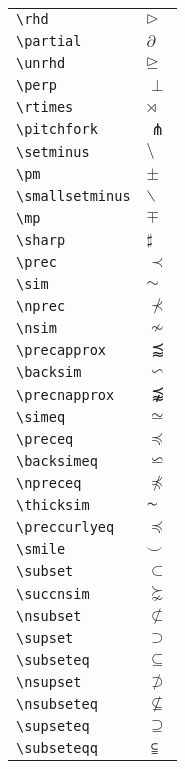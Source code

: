\documentclass[text,xhtml,itex]{internet}
\begin{document}
\begin{tabular}{ll}
\verb+\rhd+ & \(\rhd\) \\
\verb+\partial+ & \(\partial\) \\
\verb+\unrhd+ & \(\unrhd\) \\
\verb+\perp+ & \(\perp\)             \\
\verb+\rtimes+ & \(\rtimes\) \\
\verb+\pitchfork+ & \(\pitchfork\) \\
\verb+\setminus+ & \(\setminus\) \\
\verb+\pm+ & \(\pm\)               \\
\verb+\smallsetminus+ & \(\smallsetminus\) \\
\verb+\mp+                & \(\mp\) \\
\verb+\sharp+ & \(\sharp\) \\
\verb+\prec+ & \(\prec\) \\
\verb+\sim+               & \(\sim\) \\
\verb+\nprec+ & \(\nprec\)            \\
\verb+\nsim+ & \(\nsim\) \\
\verb+\precapprox+ & \(\precapprox\) \\
\verb+\backsim+ & \(\backsim\) \\
\verb+\precnapprox+ & \(\precnapprox\)      \\
\verb+\simeq+ & \(\simeq\) \\
\verb+\preceq+ & \(\preceq\) \\
\verb+\backsimeq+ & \(\backsimeq\) \\
\verb+\npreceq+ & \(\npreceq\)          \\
\verb+\thicksim+ & \(\thicksim\) \\
\verb+\preccurlyeq+ & \(\preccurlyeq\) \\
\verb+\smile+ & \(\smile\) \\
\verb+\subset+                & \(\subset\) \\
\verb+\succnsim+ & \(\succnsim\) \\
\verb+\nsubset+ & \(\nsubset\)          \\
\verb+\supset+ & \(\supset\) \\
\verb+\subseteq+              & \(\subseteq\) \\
\verb+\nsupset+ & \(\nsupset\) \\
\verb+\nsubseteq+ & \(\nsubseteq\)        \\
\verb+\supseteq+ & \(\supseteq\) \\
\verb+\subseteqq+             & \(\subseteqq\) \\

\end{tabular}
\end{document}
